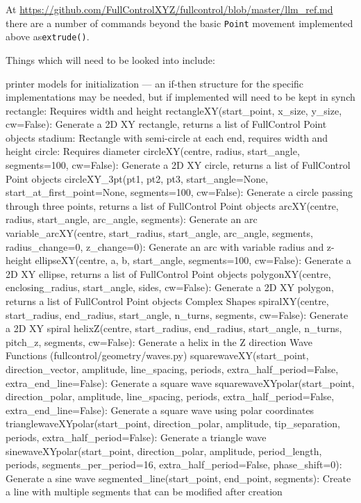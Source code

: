 \documentclass{ltxdoc}
\begin{document}
At \url{https://github.com/FullControlXYZ/fullcontrol/blob/master/llm_ref.md} there are a number of commands beyond the basic \Verb|Point| movement implemented above as\verb|extrude()|.

Things which will need to be looked into include:

\begin{outline}
\1 printer models for initialization --- an if-then structure for the specific implementations may be needed, but if implemented will need to be kept in synch
\1 rectangle: Requires width and height
\2 rectangleXY(start\_point, x\_size, y\_size, cw=False): Generate a 2D XY rectangle, returns a list of FullControl Point objects
\2 stadium: Rectangle with semi-circle at each end, requires width and height
\1 circle: Requires diameter
\2 circleXY(centre, radius, start\_angle, segments=100, cw=False): Generate a 2D XY circle, returns a list of FullControl Point objects
\2 circleXY\_3pt(pt1, pt2, pt3, start\_angle=None, start\_at\_first\_point=None, segments=100, cw=False): Generate a circle passing through three points, returns a list of FullControl Point objects
\1 arcXY(centre, radius, start\_angle, arc\_angle, segments): Generate an arc
\1 variable\_arcXY(centre, start\_radius, start\_angle, arc\_angle, segments, radius\_change=0, z\_change=0): Generate an arc with variable radius and z-height
\1 ellipseXY(centre, a, b, start\_angle, segments=100, cw=False): Generate a 2D XY ellipse, returns a list of FullControl Point objects
\1 polygonXY(centre, enclosing\_radius, start\_angle, sides, cw=False): Generate a 2D XY polygon, returns a list of FullControl Point objects
\1 Complex Shapes
\2 spiralXY(centre, start\_radius, end\_radius, start\_angle, n\_turns, segments, cw=False): Generate a 2D XY spiral
\2 helixZ(centre, start\_radius, end\_radius, start\_angle, n\_turns, pitch\_z, segments, cw=False): Generate a helix in the Z direction
\1 Wave Functions (fullcontrol/geometry/waves.py)
\2 squarewaveXY(start\_point, direction\_vector, amplitude, line\_spacing, periods, extra\_half\_period=False, extra\_end\_line=False): Generate a square wave
\2 squarewaveXYpolar(start\_point, direction\_polar, amplitude, line\_spacing, periods, extra\_half\_period=False, extra\_end\_line=False): Generate a square wave using polar coordinates
\2 trianglewaveXYpolar(start\_point, direction\_polar, amplitude, tip\_separation, periods, extra\_half\_period=False): Generate a triangle wave
\2 sinewaveXYpolar(start\_point, direction\_polar, amplitude, period\_length, periods, segments\_per\_period=16, extra\_half\_period=False, phase\_shift=0): Generate a sine wave
\2 segmented\_line(start\_point, end\_point, segments): Create a line with multiple segments that can be modified after creation
\end{outline}
\end{document}
